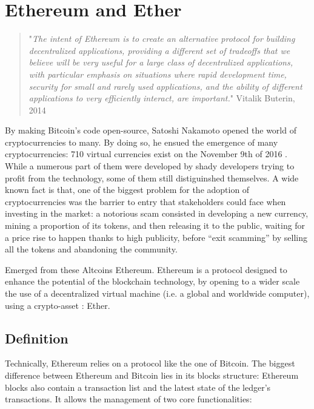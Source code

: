 \documentclass[11pt]{report}
\begin{document}
	 \section{Ethereum and Ether}
\begin{quotation}
\quotation "\textit{The intent of Ethereum is to create an alternative protocol for building decentralized applications, providing a different set of tradeoffs that we believe will be very useful for a large class of decentralized applications, with particular emphasis on situations where rapid development time, security for small and rarely used applications, and the ability of different applications to very efficiently interact, are important.}" \newline
Vitalik Buterin, 2014 \cite{BUTERIN}
\end{quotation}
\bigbreak

By making Bitcoin’s code open-source, Satoshi Nakamoto opened the world of cryptocurrencies to many. By doing so, he ensued the emergence of many cryptocurrencies: 710 virtual currencies exist on the November 9th of 2016 \cite{CRYPTOCOMPARE}. While a numerous part of them were developed by shady developers trying to profit from the technology, some of them still distiguinshed themselves. A wide known fact is that, one of the biggest problem for the adoption of cryptocurrencies was the barrier to entry that stakeholders could face when investing in the market: a notorious scam consisted in developing a new currency, mining a proportion of its tokens, and then releasing it to the public, waiting for a price rise to happen thanks to high publicity, before “exit scamming” by selling all the tokens and abandoning the community. \medbreak

Emerged from these Altcoins Ethereum. Ethereum is a protocol designed to enhance the potential of the blockchain technology, by opening to a wider scale the use of a decentralized virtual machine (i.e. a global and worldwide computer), using a crypto-asset : Ether.
\clearpage
\subsection*{Definition}

Technically, Ethereum relies on a protocol like the one of Bitcoin. The biggest difference between Ethereum and Bitcoin lies in its blocks structure: Ethereum blocks also contain a transaction list and the latest state of the ledger’s transactions. \newline
It allows the management of two core functionalities: 
\end{document}
